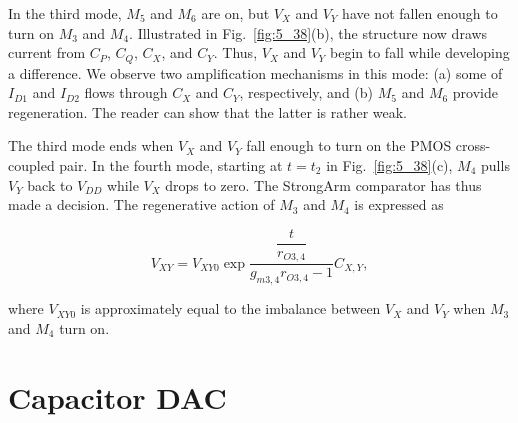 In the third mode, $M_5$ and $M_6$ are on, but $V_X$ and $V_Y$ have not fallen
enough to turn on $M_3$ and $M_4$. Illustrated in Fig.~\ref{fig:5_38}(b), the
structure now draws current from $C_P$, $C_Q$, $C_X$, and $C_Y$. Thus, $V_X$
and $V_Y$ begin to fall while developing a difference. We observe two
amplification mechanisms in this mode: (a) some of $I_{D1}$ and $I_{D2}$ flows
through $C_X$ and $C_Y$, respectively, and (b) $M_5$ and $M_6$ provide
regeneration. The reader can show that the latter is rather weak.

The third mode ends when $V_X$ and $V_Y$ fall enough to turn on the PMOS
cross-coupled pair. In the fourth mode, starting at $t = t_2$ in
Fig.~\ref{fig:5_38}(c), $M_4$ pulls $V_Y$ back to $V_{DD}$ while $V_X$ drops to
zero. The StrongArm comparator has thus made a decision. The regenerative
action of $M_3$ and $M_4$ is expressed as

\begin{equation}
	V_{XY} = V_{XY0} \exp{\dfrac{\dfrac{t}{r_{O3,4}}}{g_{m3,4} r_{O3,4} - 1} C_{X,Y}},
	\label{eq:5_41}
\end{equation}

where $V_{XY0}$ is approximately equal to the imbalance between $V_X$ and
$V_Y$ when $M_3$ and $M_4$ turn on.

\section{Capacitor DAC}
